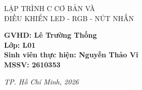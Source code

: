 \begin{titlepage}
\vspace{0.5cm}
\begin{center}
{\bfseries
    {\fontsize{15pt}{18pt}\selectfont 
    LẬP TRÌNH C CƠ BẢN VÀ\\ 
    ĐIỀU KHIỂN LED - RGB - NÚT NHẤN\par
    }
}
\end{center}
\vspace{3cm}
\begin{flushleft}
    {\fontsize{13pt}{16pt}\selectfont\bfseries
    GVHD: Lê Trường Thống\\[0.2cm]
    Lớp: L01\\[0.2cm]
    Sinh viên thực hiện: Nguyễn Thảo Vi\\[0.2cm]
    MSSV: 2610353\\
    }
\end{flushleft}
\vspace{0.2cm}
    
\vfill


    \centerline{\fontsize{17pt}{16pt}\selectfont\textit{TP. Hồ Chí Minh, 2026}}
\end{titlepage}